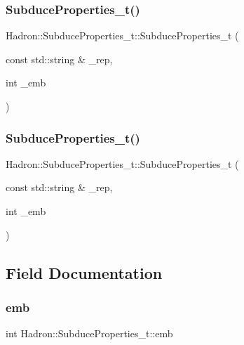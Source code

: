 \subsubsection{\texorpdfstring{SubduceProperties\_t()}{SubduceProperties\_t()}\hspace{0.1cm}{\footnotesize\ttfamily [2/3]}}
{\footnotesize\ttfamily Hadron\+::\+Subduce\+Properties\+\_\+t\+::\+Subduce\+Properties\+\_\+t (\begin{DoxyParamCaption}\item[{const std\+::string \&}]{\+\_\+rep,  }\item[{int}]{\+\_\+emb }\end{DoxyParamCaption})\hspace{0.3cm}{\ttfamily [inline]}}

\mbox{\label{structHadron_1_1SubduceProperties__t_a265cb361b85b50a1619fda24fc575389}} 
\subsubsection{\texorpdfstring{SubduceProperties\_t()}{SubduceProperties\_t()}\hspace{0.1cm}{\footnotesize\ttfamily [3/3]}}
{\footnotesize\ttfamily Hadron\+::\+Subduce\+Properties\+\_\+t\+::\+Subduce\+Properties\+\_\+t (\begin{DoxyParamCaption}\item[{const std\+::string \&}]{\+\_\+rep,  }\item[{int}]{\+\_\+emb }\end{DoxyParamCaption})\hspace{0.3cm}{\ttfamily [inline]}}



\subsection{Field Documentation}
\mbox{\label{structHadron_1_1SubduceProperties__t_a3204da77d97084fac69eff126dcf6663}} 
\subsubsection{\texorpdfstring{emb}{emb}}
{\footnotesize\ttfamily int Hadron\+::\+Subduce\+Properties\+\_\+t\+::emb}

